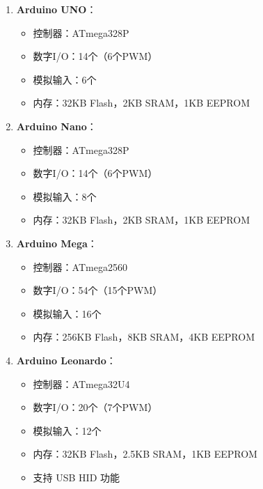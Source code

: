 \documentclass[12pt,UTF8]{ctexbook}
\begin{document}
\begin{enumerate}
    \item \textbf{Arduino UNO}：
    \begin{itemize}
        \item 控制器：ATmega328P
        \item 数字I/O：14个（6个PWM）
        \item 模拟输入：6个
        \item 内存：32KB Flash，2KB SRAM，1KB EEPROM
    \end{itemize}
    
    \item \textbf{Arduino Nano}：
    \begin{itemize}
        \item 控制器：ATmega328P
        \item 数字I/O：14个（6个PWM）
        \item 模拟输入：8个
        \item 内存：32KB Flash，2KB SRAM，1KB EEPROM
    \end{itemize}
    
    \item \textbf{Arduino Mega}：
    \begin{itemize}
        \item 控制器：ATmega2560
        \item 数字I/O：54个（15个PWM）
        \item 模拟输入：16个
        \item 内存：256KB Flash，8KB SRAM，4KB EEPROM
    \end{itemize}
    
    \item \textbf{Arduino Leonardo}：
    \begin{itemize}
        \item 控制器：ATmega32U4
        \item 数字I/O：20个（7个PWM）
        \item 模拟输入：12个
        \item 内存：32KB Flash，2.5KB SRAM，1KB EEPROM
        \item 支持 USB HID 功能
    \end{itemize}
\end{enumerate}

\backmatter
\end{document}
